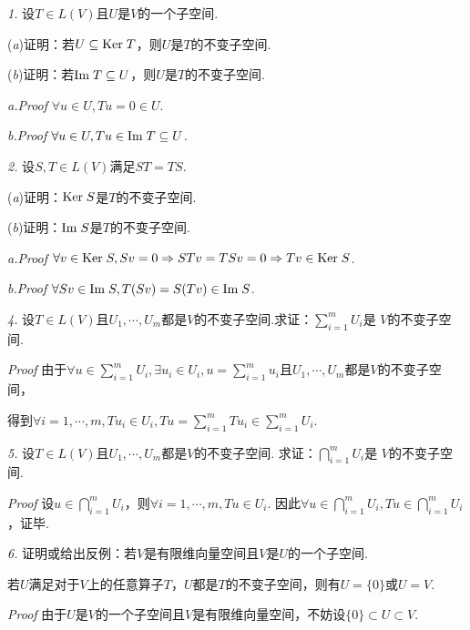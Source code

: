 \textit{1.}
设\(T \in L(V)\)且\(U\)是\(V\)的一个子空间.

(\textit{a})证明：若\(U \subseteq \mathrm{Ker \;} T\)，则\(U\)是\(T\)的不变子空间.

(\textit{b})证明：若\(\mathrm{Im \;} T \subseteq U\)，则\(U\)是\(T\)的不变子空间.

\textit{a.Proof}
\(\forall u \in U,Tu=0 \in U\).

\textit{b.Proof}
\(\forall u \in U,Tu \in \mathrm{Im \;} T \subseteq U\).

\hspace*{\fill}

\textit{2.}
设\(S,T \in L(V)\)满足\(ST=TS\).

(\textit{a})证明：\(\mathrm{Ker \;} S\)是\(T\)的不变子空间.

(\textit{b})证明：\(\mathrm{Im \;} S\)是\(T\)的不变子空间.

\textit{a.Proof}
\(\forall v \in \mathrm{Ker \;} S,Sv=0 \Rightarrow STv=TSv=0 \Rightarrow Tv \in \mathrm{Ker \;} S\).

\textit{b.Proof}
\(\forall Sv \in \mathrm{Im \;} S,T(Sv)=S(Tv) \in \mathrm{Im \;} S\).

\hspace*{\fill}

\textit{4.}
设\(T \in L(V)\)且\(U_1,\cdots,U_m\)都是\(V\)的不变子空间.求证：\(\sum_{i=1}^m U_i\)是 \(V\)的不变子空间.

\textit{Proof}
由于\(\forall u \in \sum_{i=1}^m U_i,\exists u_i \in U_i,u=\sum_{i=1}^m u_i\)且\(U_1,\cdots,U_m\)都是\(V\)的不变子空间，

得到\(\forall i=1,\cdots,m,Tu_i \in U_i,Tu=\sum_{i=1}^m Tu_i \in \sum_{i=1}^m U_i\).

\hspace*{\fill}

\textit{5.}
设\(T \in L(V)\)且\(U_1,\cdots,U_m\)都是\(V\)的不变子空间.
求证：\(\bigcap_{i=1}^m U_i\)是 \(V\)的不变子空间.

\textit{Proof}
设\(u \in \bigcap_{i=1}^m U_i\)，则\(\forall i=1,\cdots,m,Tu \in U_i\).
因此\(\forall u \in \bigcap_{i=1}^m U_i,Tu \in \bigcap_{i=1}^m U_i\)，证毕.

\hspace*{\fill}

\textit{6.}
证明或给出反例：若\(V\)是有限维向量空间且\(V\)是\(U\)的一个子空间.

若\(U\)满足对于\(V\)上的任意算子\(T\)，\(U\)都是\(T\)的不变子空间，则有\(U=\{0\}\)或\(U=V\).

\textit{Proof}
由于\(U\)是\(V\)的一个子空间且\(V\)是有限维向量空间，不妨设\(\{0\} \subset U \subset V\).

